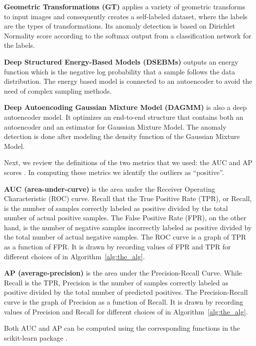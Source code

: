 \documentclass{article} \usepackage{iclr2020_conference,times}
\begin{document}
\textbf{Geometric Transformations (GT)} applies a variety of geometric transforms to input images and consequently creates a self-labeled dataset, where the labels are the types of transformations. Its anomaly detection is based on Dirichlet Normality score according to the softmax output from a classification network for the labels. 

\textbf{Deep Structured Energy-Based Models (DSEBMs)} outputs
an energy function which is the negative log probability that a sample follows the data distribution. The energy based model is connected to an autoencoder to avoid the need of complex sampling methods.

\textbf{Deep Autoencoding Gaussian Mixture Model (DAGMM)} is also a deep autoencoder model. It optimizes an end-to-end structure that contains both an autoencoder and an estimator for Gaussian Mixture Model. The anomaly detection is done after modeling the density function of the Gaussian Mixture Model.

Next, we review the definitions of the two metrics that we used: the AUC and AP scores  \citep{davis2006relationship}. In computing these metrics we identify the outliers as ``positive''.



\textbf{AUC (area-under-curve)} is the area under the Receiver Operating Characteristic (ROC) curve. Recall that the True Positive Rate (TPR), or Recall, is the number of samples correctly labeled as positive divided by the total number of actual positive samples. The False Positive Rate (FPR), on the other hand, is the number of negative samples incorrectly labeled as positive divided by the total number of actual negative samples. The ROC curve is a graph of TPR as a function of FPR. It is drawn by recording values of FPR and TPR for different choices of  in Algorithm~\ref{alg:the_alg}.



\textbf{AP (average-precision)} is the area under the Precision-Recall Curve. While Recall is the TPR, Precision is the number of samples correctly labeled as positive divided by the total number of predicted positives. The  Precision-Recall curve is the graph of  Precision as a function of Recall.
It is drawn by recording values of Precision and Recall for different choices of  in Algorithm~\ref{alg:the_alg}.



Both AUC and AP can be computed using the corresponding functions in the scikit-learn package \citep{scikit-learn}.
\end{document}
